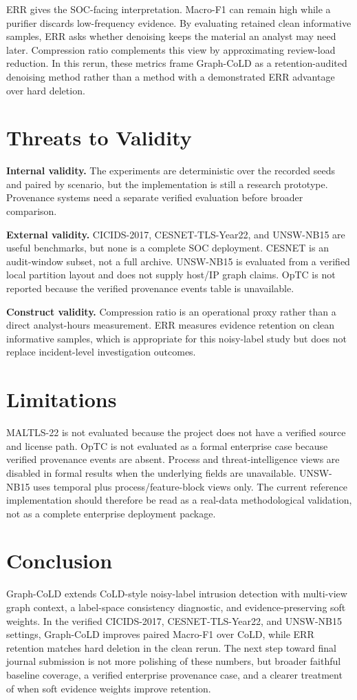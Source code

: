 \documentclass[preprint,review,12pt]{elsarticle}
\begin{document}
ERR gives the SOC-facing interpretation. Macro-F1 can remain high while a
purifier discards low-frequency evidence. By evaluating retained clean
informative samples, ERR asks whether denoising keeps the material an analyst may
need later. Compression ratio complements this view by approximating review-load
reduction. In this rerun, these metrics frame Graph-CoLD as a retention-audited
denoising method rather than a method with a demonstrated ERR advantage over
hard deletion.

\section{Threats to Validity}
\textbf{Internal validity.} The experiments are deterministic over the recorded
seeds and paired by scenario, but the implementation is still a research
prototype. Provenance systems need a separate verified evaluation before broader
comparison.

\textbf{External validity.} CICIDS-2017, CESNET-TLS-Year22, and UNSW-NB15 are
useful benchmarks, but none is a complete SOC deployment. CESNET is an
audit-window subset, not a full archive. UNSW-NB15 is evaluated from a verified
local partition layout and does not supply host/IP graph claims. OpTC is not
reported because the verified provenance events table is unavailable.

\textbf{Construct validity.} Compression ratio is an operational proxy rather
than a direct analyst-hours measurement. ERR measures evidence retention on clean
informative samples, which is appropriate for this noisy-label study but does
not replace incident-level investigation outcomes.

\section{Limitations}
MALTLS-22 is not evaluated because the project does not have a verified source
and license path. OpTC is not evaluated as a formal enterprise case because
verified provenance events are absent. Process and threat-intelligence views are
disabled in formal results when the underlying fields are unavailable. UNSW-NB15
uses temporal plus process/feature-block views only. The current reference
implementation should therefore be read as a real-data methodological
validation, not as a complete enterprise deployment package.

\section{Conclusion}
Graph-CoLD extends CoLD-style noisy-label intrusion detection with multi-view
graph context, a label-space consistency diagnostic, and evidence-preserving
soft weights. In the verified CICIDS-2017, CESNET-TLS-Year22, and UNSW-NB15
settings, Graph-CoLD improves paired Macro-F1 over CoLD, while ERR retention
matches hard deletion in the clean rerun. The next step toward final journal
submission is not more polishing of these numbers, but broader faithful baseline
coverage, a verified enterprise provenance case, and a clearer treatment of when
soft evidence weights improve retention.
\end{document}

